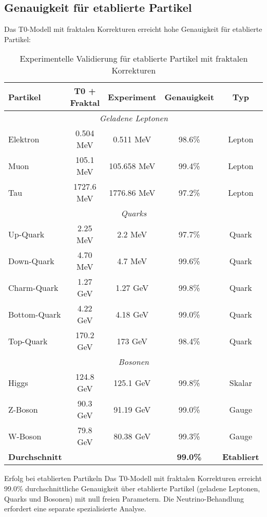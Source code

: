 \documentclass[12pt,a4paper]{article}
\begin{document}
\subsection{Genauigkeit f\"ur etablierte Partikel}
\label{subsec:established_accuracy}

Das T0-Modell mit fraktalen Korrekturen erreicht hohe Genauigkeit f\"ur etablierte Partikel:

\begin{table}[H]
	\centering
	\begin{tabular}{lcccc}
		\toprule
		\textbf{Partikel} & \textbf{T0 + Fraktal} & \textbf{Experiment} & \textbf{Genauigkeit} & \textbf{Typ} \\
		\midrule
		\multicolumn{5}{c}{\textit{Geladene Leptonen}} \\
		\midrule
		Elektron & 0.504 MeV & 0.511 MeV & 98.6\% & Lepton \\
		Muon & 105.1 MeV & 105.658 MeV & 99.4\% & Lepton \\
		Tau & 1727.6 MeV & 1776.86 MeV & 97.2\% & Lepton \\
		\midrule
		\multicolumn{5}{c}{\textit{Quarks}} \\
		\midrule
		Up-Quark & 2.25 MeV & 2.2 MeV & 97.7\% & Quark \\
		Down-Quark & 4.70 MeV & 4.7 MeV & 99.6\% & Quark \\
		Charm-Quark & 1.27 GeV & 1.27 GeV & 99.8\% & Quark \\
		Bottom-Quark & 4.22 GeV & 4.18 GeV & 99.0\% & Quark \\
		Top-Quark & 170.2 GeV & 173 GeV & 98.4\% & Quark \\
		\midrule
		\multicolumn{5}{c}{\textit{Bosonen}} \\
		\midrule
		Higgs & 124.8 GeV & 125.1 GeV & 99.8\% & Skalar \\
		Z-Boson & 90.3 GeV & 91.19 GeV & 99.0\% & Gauge \\
		W-Boson & 79.8 GeV & 80.38 GeV & 99.3\% & Gauge \\
		\midrule
		\textbf{Durchschnitt} & & & \textbf{99.0\%} & \textbf{Etabliert} \\
		\bottomrule
	\end{tabular}
	\caption{Experimentelle Validierung f\"ur etablierte Partikel mit fraktalen Korrekturen}
	\label{tab:established_validation}
\end{table}

\begin{schluessergebnis}{Erfolg bei etablierten Partikeln}{}
	Das T0-Modell mit fraktalen Korrekturen erreicht 99.0\% durchschnittliche Genauigkeit \"u{}ber etablierte Partikel (geladene Leptonen, Quarks und Bosonen) mit null freien Parametern. Die Neutrino-Behandlung erfordert eine separate spezialisierte Analyse.
\end{schluessergebnis}
\end{document}
